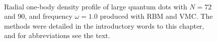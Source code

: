 \begin{figure}
	\centering
	\captionsetup[subfigure]{labelformat=empty}
	\hspace{-0.5cm}
	\\
	\caption{Radial one-body density profile of large quantum dots with $N=72$ and 90, and frequency $\omega=1.0$ produced with RBM and VMC. The methods were detailed in the introductory words to this chapter, and for abbreviations see the text.}
	\label{fig:largedotsOB}
\end{figure}

